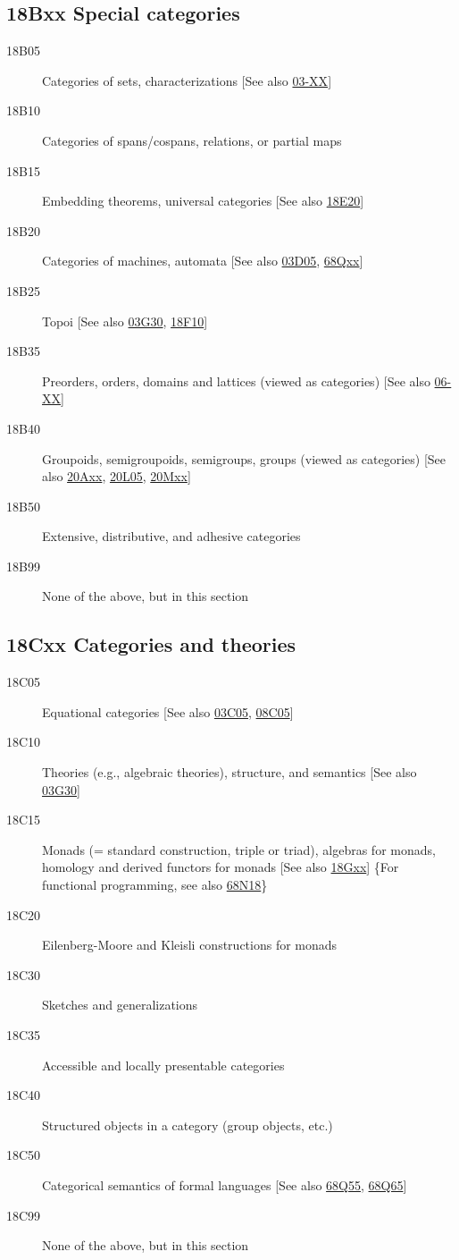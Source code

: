 \documentclass[letterpaper]{article}
\begin{document}
\subsection*{18Bxx  Special categories }\label{18Bxx}
\begin{description}  
\item [18B05]\label{18B05} Categories of sets, characterizations [See also \hyperref[03-XX]{03-XX}]
\item [18B10]\label{18B10} Categories of spans/cospans, relations, or partial maps
\item [18B15]\label{18B15} Embedding theorems, universal categories [See also \hyperref[18E20]{18E20}]
\item [18B20]\label{18B20} Categories of machines, automata [See also \hyperref[03D05]{03D05}, \hyperref[68Qxx]{68Qxx}]
\item [18B25]\label{18B25} Topoi [See also \hyperref[03G30]{03G30}, \hyperref[18F10]{18F10}]
\item [18B35]\label{18B35} Preorders, orders, domains and lattices (viewed as categories) [See also \hyperref[06-XX]{06-XX}]
\item [18B40]\label{18B40} Groupoids, semigroupoids, semigroups, groups (viewed as categories) [See also \hyperref[20Axx]{20Axx}, \hyperref[20L05]{20L05}, \hyperref[20Mxx]{20Mxx}]
\item [18B50]\label{18B50} Extensive, distributive, and adhesive categories
\item [18B99]\label{18B99} None of the above, but in this section
\end{description}
\subsection*{18Cxx  Categories and theories }\label{18Cxx}
\begin{description}  
\item [18C05]\label{18C05} Equational categories [See also \hyperref[03C05]{03C05}, \hyperref[08C05]{08C05}]
\item [18C10]\label{18C10} Theories (e.g., algebraic theories), structure, and semantics [See also \hyperref[03G30]{03G30}]
\item [18C15]\label{18C15} Monads (= standard construction, triple or triad), algebras for monads, homology and derived functors for monads [See also \hyperref[18Gxx]{18Gxx}] \{For functional programming, see also \hyperref[68N18]{68N18}\}
\item [18C20]\label{18C20} Eilenberg-Moore and Kleisli constructions for monads
\item [18C30]\label{18C30} Sketches and generalizations
\item [18C35]\label{18C35} Accessible and locally presentable categories
\item [18C40]\label{18C40} Structured objects in a category (group objects, etc.)
\item [18C50]\label{18C50} Categorical semantics of formal languages [See also \hyperref[68Q55]{68Q55}, \hyperref[68Q65]{68Q65}]
\item [18C99]\label{18C99} None of the above, but in this section
\end{description}
\end{document}
